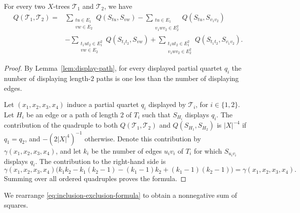 \documentclass[12pt]{article}
\begin{document}
\begin{theorem}\label{thm:inclusion-exclusion}
For every two $X$-trees $\mathcal T_1$ and $\mathcal T_2$, we have
\begin{equation}\label{eq:inclusion-exclusion-formula}
\begin{aligned}
Q(\mathcal T_1,\mathcal T_2)
={}&\sum_{\substack{tu\in E_1\\vw\in E_2}}Q(S_{tu},S_{vw})
-\sum_{\substack{tu\in E_1\\v_1wv_2\in E_2^2}}Q(S_{tu},S_{v_1v_2})\\
&-\sum_{\substack{t_1ut_2\in E_1^2\\vw\in E_2}}Q(S_{t_1t_2},S_{vw})
+\sum_{\substack{t_1ut_2\in E_1^2\\v_1wv_2\in E_2^2}}
Q(S_{t_1t_2},S_{v_1v_2}).
\end{aligned}
\end{equation}
\end{theorem}

\begin{proof}
By Lemma~\ref{lem:display-path}, for every displayed partial quartet $q_i$
the number of displaying length-$2$ paths is one less than the number of
displaying edges.

Let $(x_1,x_2,x_3,x_4)$ induce a partial quartet $q_i$ displayed by
$\mathcal T_i$, for $i\in\{1,2\}$.  Let $H_i$ be an edge or a path of
length $2$ of $T_i$ such that $S_{H_i}$ displays $q_i$.  The contribution
of the quadruple to both $Q(\mathcal T_1,\mathcal T_2)$ and
$Q(S_{H_1},S_{H_2})$ is $|X|^{-4}$ if $q_1=q_2$, and
$-(2|X|^4)^{-1}$ otherwise.  Denote this contribution by
$\gamma(x_1,x_2,x_3,x_4)$, and let $k_i$ be the number of edges $u_iv_i$
of $T_i$ for which $S_{u_iv_i}$ displays $q_i$.  The contribution to the
right-hand side is
\begin{equation}\label{eq:display-019}
\gamma(x_1,x_2,x_3,x_4)
\bigl(k_1k_2-k_1(k_2-1)-(k_1-1)k_2+(k_1-1)(k_2-1)\bigr)
=\gamma(x_1,x_2,x_3,x_4).
\end{equation}
Summing over all ordered quadruples proves the formula.
\end{proof}

We rearrange \eqref{eq:inclusion-exclusion-formula} to obtain a
nonnegative sum of squares.
\end{document}
